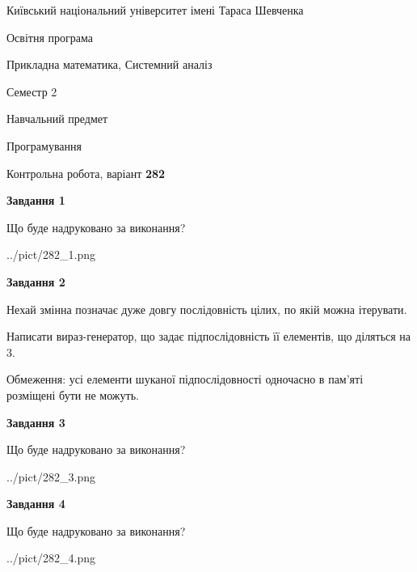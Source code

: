 \documentclass[12pt, ukrainian]{article}
\begin{document}
{{\begin {small}\par
{ \center  Київський національний університет імені Тараса Шевченка \par}
{\parbox {5 cm}{Освітня програма \hfill}{\parbox {8 cm}{Прикладна математика, Системний аналіз \hfill}}\parbox {5 cm}{\hfill Семестр 2}}\par
{\parbox {5 cm} {Навчальний предмет \hfill}\parbox {7 cm}{Програмування \hfill}\parbox {6cm}{\hfill}\par}\vspace{-7pt} \end{small}}{\center Контрольна робота, варіант  \No \textbf
{ 282 }\par}}
{
\begin {large}
{\begin {center}\textbf{Завдання 1}\end {center}}\par
Що буде надруковано за виконання?\par\par
\begin{center}
	{../pict/282_1.png}
\end{center}
\newpage

{\begin {center}\textbf{Завдання 2}\end {center}}\par
Нехай змінна  позначає дуже довгу послідовність цілих, по якій можна ітерувати.

Написати вираз-генератор, що задає підпослідовність її елементів, що діляться на 3.

Обмеження: усі елементи шуканої підпослідовності одночасно в пам'яті розміщені бути не можуть.\par
\newpage

{\begin {center}\textbf{Завдання 3}\end {center}}\par
Що буде надруковано за виконання?\par
\begin{center}
	{../pict/282_3.png}
\end{center}
\newpage

{\begin {center}\textbf{Завдання 4}\end {center}}\par
Що буде надруковано за виконання?\par
\begin{center}
	{../pict/282_4.png}
\end{center}
\newpage


\end{large}}
\end{document}
